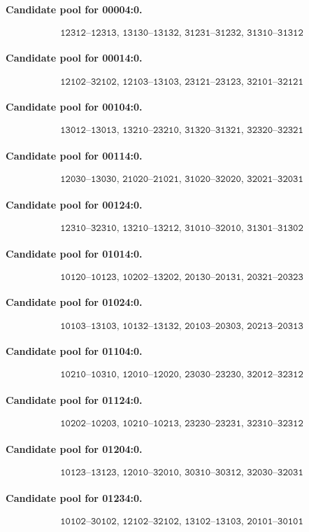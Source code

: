 \paragraph{Candidate pool for 00004:0.}
\[\texttt{12312--12313,\ 13130--13132,\ 31231--31232,\ 31310--31312}\]
\paragraph{Candidate pool for 00014:0.}
\[\texttt{12102--32102,\ 12103--13103,\ 23121--23123,\ 32101--32121}\]
\paragraph{Candidate pool for 00104:0.}
\[\texttt{13012--13013,\ 13210--23210,\ 31320--31321,\ 32320--32321}\]
\paragraph{Candidate pool for 00114:0.}
\[\texttt{12030--13030,\ 21020--21021,\ 31020--32020,\ 32021--32031}\]
\paragraph{Candidate pool for 00124:0.}
\[\texttt{12310--32310,\ 13210--13212,\ 31010--32010,\ 31301--31302}\]
\paragraph{Candidate pool for 01014:0.}
\[\texttt{10120--10123,\ 10202--13202,\ 20130--20131,\ 20321--20323}\]
\paragraph{Candidate pool for 01024:0.}
\[\texttt{10103--13103,\ 10132--13132,\ 20103--20303,\ 20213--20313}\]
\paragraph{Candidate pool for 01104:0.}
\[\texttt{10210--10310,\ 12010--12020,\ 23030--23230,\ 32012--32312}\]
\paragraph{Candidate pool for 01124:0.}
\[\texttt{10202--10203,\ 10210--10213,\ 23230--23231,\ 32310--32312}\]
\paragraph{Candidate pool for 01204:0.}
\[\texttt{10123--13123,\ 12010--32010,\ 30310--30312,\ 32030--32031}\]
\paragraph{Candidate pool for 01234:0.}
\[\texttt{10102--30102,\ 12102--32102,\ 13102--13103,\ 20101--30101}\]
